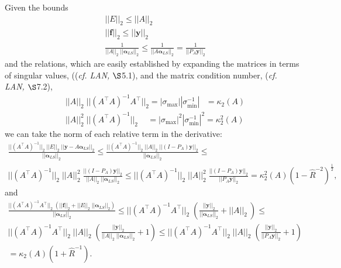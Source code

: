 \documentclass[12pt, twoside, draft]{article}
\begin{document}
Given the bounds
\begin{align}
&|| E ||_2 \leq ||A||_2 \\
&||\mathbf{f}||_2 \leq ||\mathbf{y} ||_2 \\
&\frac{1}{||A||_2 \; ||\boldsymbol{\alpha}_{LS } ||_2} \leq \frac{1}{||A \boldsymbol{\alpha}_{LS } ||_2} = \frac{1}{|| P_A \mathbf{y} ||_2}
\end{align}
and the relations, which are easily established by expanding the matrices in terms of singular values, ((\textit{cf. LAN,} $\S$5.1), and the  matrix condition number, (\textit{cf. LAN,} $\S$7.2),
\begin{align}
&||A||_2 \; ||(A^\top A)^{-1} A^\top ||_2 = |\sigma_{\operatorname{max}}| |\sigma^{-1}_{\operatorname{min}}| \hspace{9pt}= \kappa_2(A) \\
&||A||^2_2 \; ||(A^\top A)^{-1} ||_2 \hspace{14pt} =|\sigma_{\operatorname{max}}|^2 |\sigma^{-1}_{\operatorname{min}}|^{2} = \kappa_2^2(A)
\end{align}
we can take the norm of each relative term in the derivative:
\begin{multline}
\frac{||(A^\top A)^{-1} ||_2 \; ||E||_2 \; || \mathbf{y} - A \boldsymbol{\alpha}_{LS} ||_2}{|| \boldsymbol{\alpha}_{LS} ||_2} \leq \frac{ ||(A^\top A)^{-1} ||_2 \; ||A||_2 \; || (I - P_A) \mathbf{y}||_2}{|| \boldsymbol{\alpha}_{LS} ||_2} \leq \\
||(A^\top A)^{-1} ||_2 \; ||A||^2_2 \; \frac{|| (I - P_A) \mathbf{y}||_2}{|| A ||_2 \; || \boldsymbol{\alpha}_{LS} ||_2} \leq ||(A^\top A)^{-1} ||_2 \; ||A||^2_2 \; \frac{|| (I - P_A) \mathbf{y}||_2}{|| P_A \mathbf{y} ||_2} = \kappa_2^2(A) (1 - \hat{R}^{-2})^\frac{1}{2},
\end{multline}
and
\begin{multline}
\frac{|| (A^\top A)^{-1} A^\top ||_2 \; (|| \mathbf{f} ||_2 + || E ||_2 \; ||\boldsymbol{\alpha}_{LS}||_2 )}{|| \boldsymbol{\alpha}_{LS} ||_2} \leq || (A^\top A)^{-1} A^\top ||_2 \; \left( \frac{ || \mathbf{y} ||_2}{|| \boldsymbol{\alpha}_{LS} ||_2} + || A ||_2 \  \right)\leq \\
|| (A^\top A)^{-1} A^\top ||_2 \; ||A||_2 \; \left(\frac{ || \mathbf{y} ||_2 }{ || A ||_2 \; || \boldsymbol{\alpha}_{LS} ||_2}+ 1 \right)
\leq || (A^\top A)^{-1} A^\top ||_2 \; ||A||_2 \; \left(\frac{ || \mathbf{y} ||_2 }{ || P_A \mathbf{y} ||_2}+ 1 \right) \\ 
= \kappa_2(A) (1 + \hat{R}^{-1}).
\end{multline}
\end{document}
